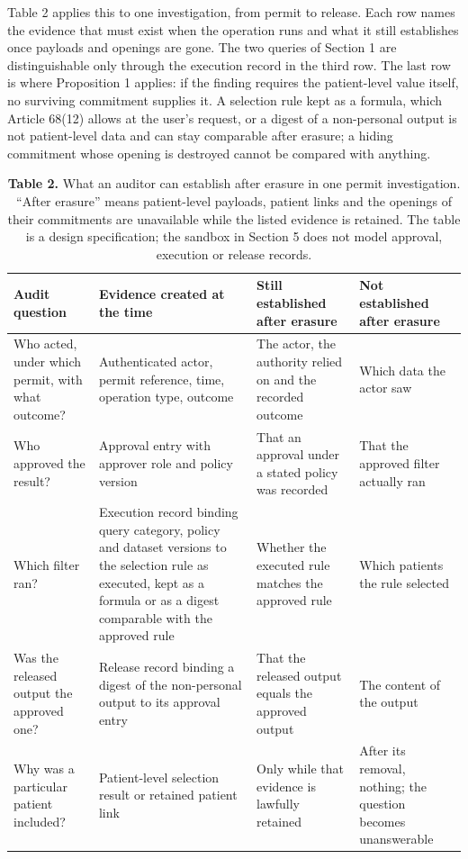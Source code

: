\documentclass[5p,twocolumn]{elsarticle}
\begin{document}
Table 2 applies this to one investigation, from permit to release. Each
row names the evidence that must exist when the operation runs and what
it still establishes once payloads and openings are gone. The two
queries of Section 1 are distinguishable only through the execution
record in the third row. The last row is where Proposition 1 applies: if
the finding requires the patient-level value itself, no surviving
commitment supplies it. A selection rule kept as a formula, which
Article 68(12) allows at the user's request, or a digest of a
non-personal output is not patient-level data and can stay comparable
after erasure; a hiding commitment whose opening is destroyed cannot be
compared with anything.

\begin{table}[!tbp]
\captionsetup{justification=raggedright,singlelinecheck=false}
\caption*{\textbf{Table 2.} What an auditor can establish after erasure in one
permit investigation. ``After erasure'' means patient-level payloads,
patient links and the openings of their commitments are unavailable
while the listed evidence is retained. The table is a design
specification; the sandbox in Section 5 does not model approval,
execution or release records.}
\small
\begin{tabularx}{\textwidth}{>{\raggedright\arraybackslash}X>{\raggedright\arraybackslash}X>{\raggedright\arraybackslash}X>{\raggedright\arraybackslash}X}
\toprule
\textbf{Audit question} & \textbf{Evidence created at the time} & \textbf{Still established after erasure} & \textbf{Not established after erasure} \\
\midrule
Who acted, under which permit, with what outcome? & Authenticated actor, permit reference, time, operation type, outcome & The actor, the authority relied on and the recorded outcome & Which data the actor saw \\
Who approved the result? & Approval entry with approver role and policy version & That an approval under a stated policy was recorded & That the approved filter actually ran \\
Which filter ran? & Execution record binding query category, policy and dataset versions to the selection rule as executed, kept as a formula or as a digest comparable with the approved rule & Whether the executed rule matches the approved rule & Which patients the rule selected \\
Was the released output the approved one? & Release record binding a digest of the non-personal output to its approval entry & That the released output equals the approved output & The content of the output \\
Why was a particular patient included? & Patient-level selection result or retained patient link & Only while that evidence is lawfully retained & After its removal, nothing; the question becomes unanswerable \\
\bottomrule
\end{tabularx}
\end{table}
\end{document}
